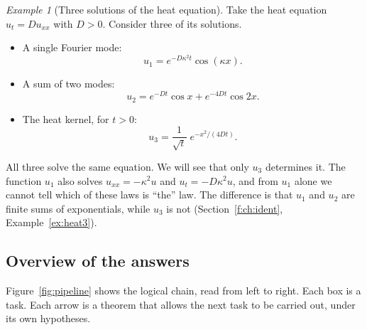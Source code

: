 \documentclass[11pt]{article}
\theoremstyle{plain}
\theoremstyle{definition}
\theoremstyle{remark}
\newtheorem{example}[theorem]{Example}
\begin{document}
\begin{example}[{Three solutions of the heat equation}]
Take the heat equation $u_t=Du_{xx}$ with $D>0$. Consider three of its solutions.
\begin{itemize}
\item A single Fourier mode:
\[
u_1=e^{-D\kappa^2t}\cos(\kappa x).
\]
\item A sum of two modes:
\[
u_2=e^{-Dt}\cos x+e^{-4Dt}\cos 2x.
\]
\item The heat kernel, for $t>0$:
\[
u_3=\frac{1}{\sqrt{t}}\;e^{-x^2/(4Dt)}.
\]
\end{itemize}
All three solve the same equation. We will see that only $u_3$ determines it. The function $u_1$ also solves $u_{xx}=-\kappa^2u$ and $u_t=-D\kappa^2u$, and from $u_1$ alone we cannot tell which of these laws is ``the'' law. The difference is that $u_1$ and $u_2$ are finite sums of exponentials, while $u_3$ is not (Section~\ref{f:ch:ident}, Example~\ref{ex:heat3}).
\end{example}

\subsection{Overview of the answers}

Figure~\ref{fig:pipeline} shows the logical chain, read from left to right. Each box is a task. Each arrow is a theorem that allows the next task to be carried out, under its own hypotheses.
\end{document}

